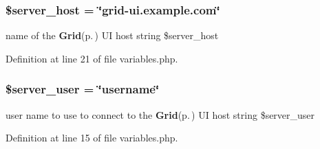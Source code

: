 \subsubsection{\setlength{\rightskip}{0pt plus 5cm}\$server\_\-host = \char`\"{}grid-ui.example.com\char`\"{}}\label{variables_8php_a1}


name of the {\bf Grid}{\rm (p.\,\pageref{classGrid})} UI host  string \$server\_\-host 



Definition at line 21 of file variables.php.
\subsubsection{\setlength{\rightskip}{0pt plus 5cm}\$server\_\-user = \char`\"{}username\char`\"{}}\label{variables_8php_a0}


user name to use to connect to the {\bf Grid}{\rm (p.\,\pageref{classGrid})} UI host  string \$server\_\-user 



Definition at line 15 of file variables.php.